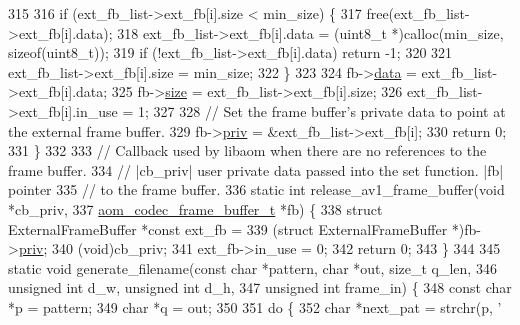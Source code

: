 \begin{DoxyCodeInclude}
{{{{{{{{315 
316   \textcolor{keywordflow}{if} (ext\_fb\_list->ext\_fb[i].size < min\_size) \{
317     free(ext\_fb\_list->ext\_fb[i].data);
318     ext\_fb\_list->ext\_fb[i].data = (uint8\_t *)calloc(min\_size, \textcolor{keyword}{sizeof}(uint8\_t));
319     \textcolor{keywordflow}{if} (!ext\_fb\_list->ext\_fb[i].data) \textcolor{keywordflow}{return} -1;
320 
321     ext\_fb\_list->ext\_fb[i].size = min\_size;
322   \}
323 
324   fb->\hyperlink{structaom__codec__frame__buffer_a4b73719e1d6756516de8cbceb68822d2}{data} = ext\_fb\_list->ext\_fb[i].data;
325   fb->\hyperlink{structaom__codec__frame__buffer_a6fc24049c4e1706ce3a462825009f3d4}{size} = ext\_fb\_list->ext\_fb[i].size;
326   ext\_fb\_list->ext\_fb[i].in\_use = 1;
327 
328   \textcolor{comment}{// Set the frame buffer's private data to point at the external frame buffer.}
329   fb->\hyperlink{structaom__codec__frame__buffer_aa689f8e27421eebc9e1c70b607e415ef}{priv} = &ext\_fb\_list->ext\_fb[i];
330   \textcolor{keywordflow}{return} 0;
331 \}
332 
333 \textcolor{comment}{// Callback used by libaom when there are no references to the frame buffer.}
334 \textcolor{comment}{// |cb\_priv| user private data passed into the set function. |fb| pointer}
335 \textcolor{comment}{// to the frame buffer.}
336 \textcolor{keyword}{static} \textcolor{keywordtype}{int} release\_av1\_frame\_buffer(\textcolor{keywordtype}{void} *cb\_priv,
337                                     \hyperlink{structaom__codec__frame__buffer}{aom\_codec\_frame\_buffer\_t} *fb) \{
338   \textcolor{keyword}{struct }ExternalFrameBuffer *\textcolor{keyword}{const} ext\_fb =
339       (\textcolor{keyword}{struct }ExternalFrameBuffer *)fb->\hyperlink{structaom__codec__frame__buffer_aa689f8e27421eebc9e1c70b607e415ef}{priv};
340   (\textcolor{keywordtype}{void})cb\_priv;
341   ext\_fb->in\_use = 0;
342   \textcolor{keywordflow}{return} 0;
343 \}
344 
345 \textcolor{keyword}{static} \textcolor{keywordtype}{void} generate\_filename(\textcolor{keyword}{const} \textcolor{keywordtype}{char} *pattern, \textcolor{keywordtype}{char} *out, \textcolor{keywordtype}{size\_t} q\_len,
346                               \textcolor{keywordtype}{unsigned} \textcolor{keywordtype}{int} d\_w, \textcolor{keywordtype}{unsigned} \textcolor{keywordtype}{int} d\_h,
347                               \textcolor{keywordtype}{unsigned} \textcolor{keywordtype}{int} frame\_in) \{
348   \textcolor{keyword}{const} \textcolor{keywordtype}{char} *p = pattern;
349   \textcolor{keywordtype}{char} *q = out;
350 
351   \textcolor{keywordflow}{do} \{
352     \textcolor{keywordtype}{char} *next\_pat = strchr(p, \textcolor{charliteral}{'%
}}}}}}}}}
\end{DoxyCodeInclude}

